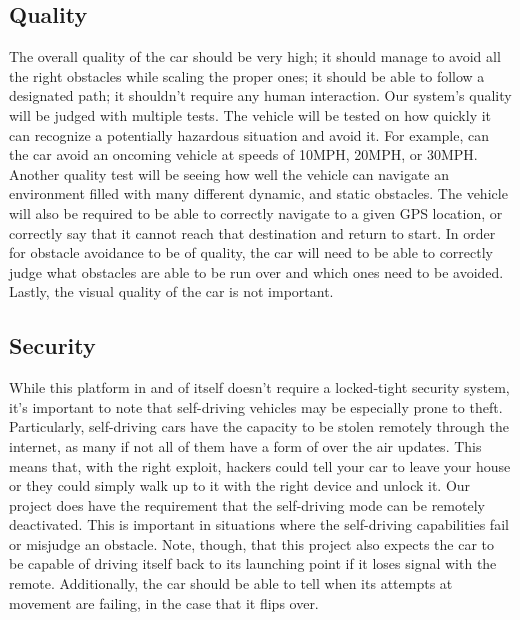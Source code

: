 \documentclass[onecolumn, draftclsnofoot,10pt]{IEEEtran}
\begin{document}
\subsection{Quality}
    The overall quality of the car should be very high; it should manage to avoid all the right obstacles while scaling the proper ones; it should be able to follow a designated path; it shouldn't require any human interaction. Our system's quality will be judged with multiple tests. The vehicle will be tested on how quickly it can recognize a potentially hazardous situation and avoid it. For example, can the car avoid an oncoming vehicle at speeds of 10MPH, 20MPH, or 30MPH. Another quality test will be seeing how well the vehicle can navigate an environment filled with many different dynamic, and static obstacles. The vehicle will also be required to be able to correctly navigate to a given GPS location, or correctly say that it cannot reach that destination and return to start. In order for obstacle avoidance to be of quality, the car will need to be able to correctly judge what obstacles are able to be run over and which ones need to be avoided. Lastly, the visual quality of the car is not important.
    
\subsection{Security}
    While this platform in and of itself doesn't require a locked-tight security system, it's important to note that self-driving vehicles may be especially prone to theft. Particularly, self-driving cars have the capacity to be stolen remotely through the internet, as many if not all of them have a form of over the air updates. This means that, with the right exploit, hackers could tell your car to leave your house or they could simply walk up to it with the right device and unlock it. Our project does have the requirement that the self-driving mode can be remotely deactivated. This is important in situations where the self-driving capabilities fail or misjudge an obstacle. Note, though, that this project also expects the car to be capable of driving itself back to its launching point if it loses signal with the remote. Additionally, the car should be able to tell when its attempts at movement are failing, in the case that it flips over.
    
\end{document}
